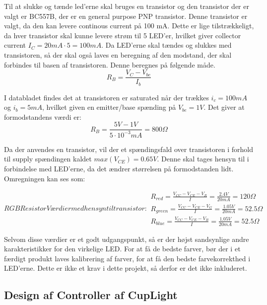 \documentclass[HardwareDesign/HardwareDesign_main.tex]{subfiles}
\begin{document}
Til at slukke og tænde led'erne skal bruges en transistor og den transistor der er valgt er BC557B, der er en general purpose PNP transistor. Denne transistor er valgt, da den kan levere continous current på 100 mA. Dette er lige tilstrækkeligt, da hver transistor skal kunne levere strøm til 5 LED'er, hvilket giver collector current $I_C=20mA\cdot5=100mA$.
Da LED'erne skal tændes og slukkes med transistoren, så der skal også laves en beregning af den modstand, der skal forbindes til basen af transistoren.
Denne beregnes på følgende måde.
\begin{equation}
    R_B = \frac{V_C-V_{be}}{I_b}
\end{equation}

I databladet \cite{datasheet_bc557b} findes det at transistoren er saturated når der trækkes $i_c=100mA$ og $i_b=5mA$, hvilket given en emitter/base spænding på $V_{be}=1V$. Det giver at formodstandens værdi er:
\begin{equation}
    R_B = \frac{5V-1V}{5\cdot 10^{-3} mA}=800\Omega
\end{equation}

Da der anvendes en transistor, vil der et spændingsfald over transistoren i forhold til supply spændingen kaldet $max(V_{CE})=0.65V$. Denne skal tages hensyn til i forbindelse med LED'erne, da det ændrer størrelsen på formodstanden lidt. Omregningen kan ses som:

\begin{subequations}
        RGB Resistor Værdier med hensyn til transistor:
\begin{align}
        R_{red}=\frac{V_{CC}-V_{CE}-V_R}{I}=\frac{2.4V}{20mA}=120\Omega\\
        R_{green}=\frac{V_{CC}-V_{CE}-V_G}{I}=\frac{1.05V}{20mA}=52.5\Omega\\
        R_{blue}=\frac{V_{CC}-V_{CE}-V_B}{I}=\frac{1.05V}{20mA}=52.5\Omega
\end{align}
\end{subequations}

Selvom disse værdier er et godt udgangspunkt, så er der højst sandsynlige andre karakteristikker for den virkelige LED. For at få de bedste farver, bør der i et færdigt produkt laves kalibrering af farver, for at få den bedste farvekorrekthed i LED'erne. Dette er ikke et krav i dette projekt, så derfor er det ikke inkluderet.

\subsection{Design af Controller af CupLight}
\end{document}
